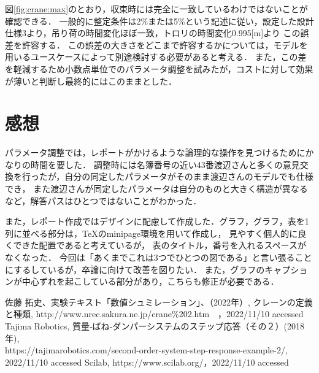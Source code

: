 \documentclass[dvipdfmx,titlepage,a4j]{jsarticle}  %
\begin{document}
図\ref{fig:crane:max}のとおり，収束時には完全に一致しているわけではないことが確認できる．
一般的に整定条件は2\%または5\%という記述に従い，設定した設計仕様3より，吊り荷の時間変化ほぼ一致，トロリの時間変化0.995[m]より
この誤差を許容する．
この誤差の大きさをどこまで許容するかについては，モデルを用いるユースケースによって別途検討する必要があると考える．
また，この差を軽減するため小数点単位でのパラメータ調整を試みたが，コストに対して効果が薄いと判断し最終的にはこのままとした．

\section{感想}
パラメータ調整では，レポートがかけるような論理的な操作を見つけるためにかなりの時間を要した．
調整時には名簿番号の近い43番渡辺さんと多くの意見交換を行ったが，自分の同定したパラメータがそのまま渡辺さんのモデルでも仕様でき，
また渡辺さんが同定したパラメータは自分のものと大きく構造が異なるなど，解答パスはひとつではないことがわかった．

また，レポート作成ではデザインに配慮して作成した．グラフ，グラフ，表を1列に並べる部分は，\TeX のminipage環境を用いて作成し，
見やすく個人的に良くできた配置であると考えているが，
表のタイトル，番号を入れるスペースがなくなった．
今回は「あくまでこれは3つでひとつの図である」と言い張ることにするしているが，卒論に向けて改善を図りたい．
また，グラフのキャプションが中心ずれを起こしている部分があり，こちらも修正が必要である．

\begin{thebibliography}{99}
   佐藤 拓史、実験テキスト「数値シュミレーション」、（2022年）,
   クレーンの定義と種類, http://www.nrec.sakura.ne.jp/crane\%202.htm　，2022/11/10 accessed
   Tajima Robotics, 質量‐ばね‐ダンパーシステムのステップ応答（その２）(2018年), \\ https://tajimarobotics.com/second-order-system-step-response-example-2/, 2022/11/10 accessed
   Scilab, https://www.scilab.org/，2022/11/10 accessed
\end{thebibliography}
\end{document}
